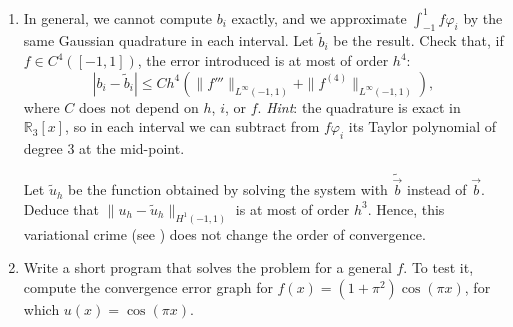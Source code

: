 \begin{exercises}
\begin{enumerate}[label=\roman*)]
\begin{equation*}
\begin{pmatrix}
                  \end{pmatrix},
              \end{equation*}
              and that the Galerkin approximation $u_h = \sum_{j=0}^N U_j \varphi_j$ is given by
              \begin{equation*}
                  (\mat K + \mat M) \vec u = \vec b, \qquad \text{where } b_i = \int_{-1}^1 f \varphi_i.
              \end{equation*}
        \item In general, we cannot compute $b_i$ exactly, and we approximate $\int_{-1}^1 f \varphi_i$ by the same Gaussian quadrature in each interval. Let $\tilde b_i$ be the result.
              Check that, if $f \in C^4([-1,1])$, the error introduced is at most of order $h^4$:
              \begin{equation*}
                  | b_i - \tilde b_i | \le C h^4 \left( \| f''' \|_{L^\infty(-1,1)} + \| f^{(4)} \|_{L^\infty(-1,1)} \right),
              \end{equation*}
              where $C$ does not depend on $h$, $i$, or $f$.
              \emph{Hint}: the quadrature is exact in $\mathbb R_3[x]$, so in each interval we can subtract from $f \varphi_i$ its Taylor polynomial of degree $3$ at the mid-point.

              Let $\tilde u_h$ be the function obtained by solving the system with $\tilde{\vec b}$ instead of $\vec b$.
              Deduce that $\| u_h - \tilde u_h \|_{H^1(-1,1)}$ is at most of order $h^3$.
              Hence, this variational crime (see ) does not change the order of convergence.
        \item Write a short program that solves the problem for a general $f$.
              To test it, compute the convergence error graph for \mbox{$f(x) = (1 + \pi^2) \cos(\pi x)$}, for which \mbox{$u(x) = \cos(\pi x)$}.
    \end{enumerate}


\end{exercises}
